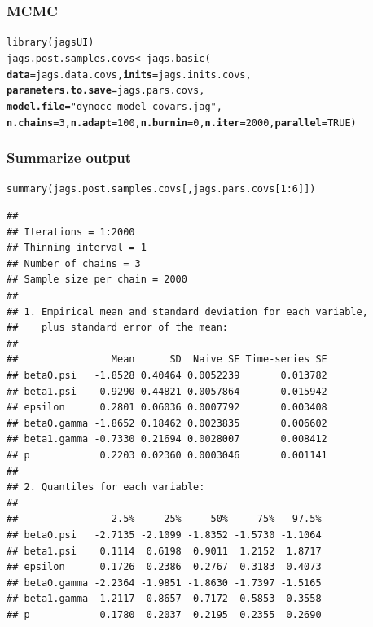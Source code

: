 \documentclass[color=usenames,dvipsnames]{beamer}\usepackage[]{graphicx}\usepackage[]{xcolor}
\makeatletter
\newcommand{\hlnum}[1]{\textcolor[rgb]{0.69,0.494,0}{#1}}%
\newcommand{\hlsng}[1]{\textcolor[rgb]{0.749,0.012,0.012}{#1}}%
\newcommand{\hlopt}[1]{\textcolor[rgb]{0,0,0}{#1}}%
\newcommand{\hldef}[1]{\textcolor[rgb]{0,0,0}{#1}}%
\newcommand{\hlkwb}[1]{\textcolor[rgb]{0,0.341,0.682}{#1}}%
\newcommand{\hlkwc}[1]{\textcolor[rgb]{0,0,0}{\textbf{#1}}}%
\newcommand{\hlkwd}[1]{\textcolor[rgb]{0.004,0.004,0.506}{#1}}%
\newenvironment{kframe}{%
 \def\at@end@of@kframe{}%
 \ifinner\ifhmode%
  \def\at@end@of@kframe{\end{minipage}}%
  \begin{minipage}{\columnwidth}%
 \fi\fi%
 \def\FrameCommand##1{\hskip\@totalleftmargin \hskip-\fboxsep
 \colorbox{shadecolor}{##1}\hskip-\fboxsep
     \hskip-\linewidth \hskip-\@totalleftmargin \hskip\columnwidth}%
 \MakeFramed {\advance\hsize-\width
   \@totalleftmargin\z@ \linewidth\hsize
   \@setminipage}}%
 {\par\unskip\endMakeFramed%
 \at@end@of@kframe}
\newenvironment{knitrout}{}{} %
\let\hlstd\hldef
\let\hlstr\hlsng
\makeatother
\begin{document}
\begin{frame}[fragile]
  \frametitle{MCMC}
  \small
\begin{knitrout}\scriptsize
{}\color{fgcolor}\begin{kframe}
\begin{alltt}
\hlkwd{library}\hlstd{(jagsUI)}
\hlstd{jags.post.samples.covs} \hlkwb{<-} \hlkwd{jags.basic}\hlstd{(}
    \hlkwc{data}\hlstd{=jags.data.covs,} \hlkwc{inits}\hlstd{=jags.inits.covs,}
    \hlkwc{parameters.to.save}\hlstd{=jags.pars.covs,}
    \hlkwc{model.file}\hlstd{=}\hlstr{"dynocc-model-covars.jag"}\hlstd{,}
    \hlkwc{n.chains}\hlstd{=}\hlnum{3}\hlstd{,} \hlkwc{n.adapt}\hlstd{=}\hlnum{100}\hlstd{,} \hlkwc{n.burnin}\hlstd{=}\hlnum{0}\hlstd{,} \hlkwc{n.iter}\hlstd{=}\hlnum{2000}\hlstd{,} \hlkwc{parallel}\hlstd{=}\hlnum{TRUE}\hlstd{)}
\end{alltt}
\end{kframe}
\end{knitrout}
\end{frame}



\begin{frame}[fragile]
  \frametitle{Summarize output}
\begin{knitrout}\tiny
{}\color{fgcolor}\begin{kframe}
\begin{alltt}
\hlkwd{summary}\hldef{(jags.post.samples.covs[,jags.pars.covs[}\hlnum{1}\hlopt{:}\hlnum{6}\hldef{]])}
\end{alltt}
\begin{verbatim}
## 
## Iterations = 1:2000
## Thinning interval = 1 
## Number of chains = 3 
## Sample size per chain = 2000 
## 
## 1. Empirical mean and standard deviation for each variable,
##    plus standard error of the mean:
## 
##                Mean      SD  Naive SE Time-series SE
## beta0.psi   -1.8528 0.40464 0.0052239       0.013782
## beta1.psi    0.9290 0.44821 0.0057864       0.015942
## epsilon      0.2801 0.06036 0.0007792       0.003408
## beta0.gamma -1.8652 0.18462 0.0023835       0.006602
## beta1.gamma -0.7330 0.21694 0.0028007       0.008412
## p            0.2203 0.02360 0.0003046       0.001141
## 
## 2. Quantiles for each variable:
## 
##                2.5%     25%     50%     75%   97.5%
## beta0.psi   -2.7135 -2.1099 -1.8352 -1.5730 -1.1064
## beta1.psi    0.1114  0.6198  0.9011  1.2152  1.8717
## epsilon      0.1726  0.2386  0.2767  0.3183  0.4073
## beta0.gamma -2.2364 -1.9851 -1.8630 -1.7397 -1.5165
## beta1.gamma -1.2117 -0.8657 -0.7172 -0.5853 -0.3558
## p            0.1780  0.2037  0.2195  0.2355  0.2690
\end{verbatim}
\end{kframe}
\end{knitrout}
\end{frame}
\end{document}

